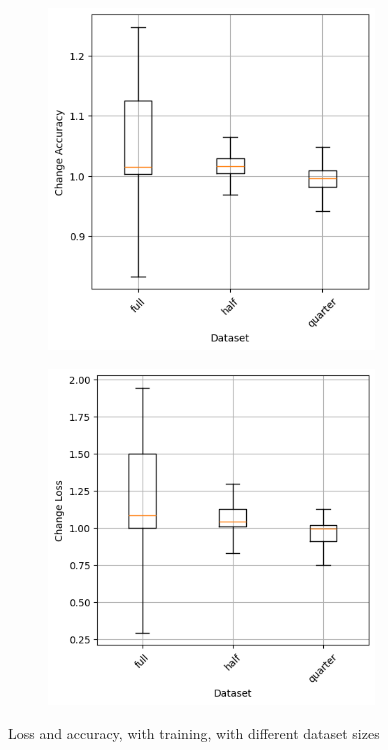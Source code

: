 \begin{figure}
    \begin{subfigure}{0.5\textwidth}
        \centering
        \includegraphics[width=0.95\textwidth]{plots/Dataset_Trained_accuracy.png}
    \end{subfigure}
    \begin{subfigure}{0.5\textwidth}
        \centering
        \includegraphics[width=0.95\textwidth]{plots/Dataset_Trained_loss.png}
    \end{subfigure}
    \caption{Loss and accuracy, with training, with different dataset sizes}
    \label{fig:dataset-size-training}
\end{figure}
